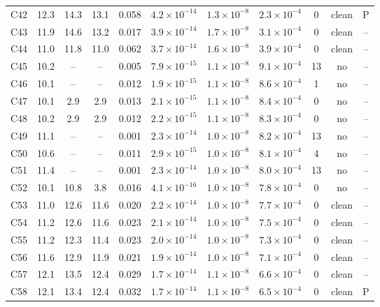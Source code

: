 \documentclass[twocolumn,epjc3]{svjour3}
\begin{document}
\begin{table}[t]
\begin{tabular}{lcccccccccc}
C42 & 12.3 & 14.3 & 13.1 & 0.058 & $4.2\!\times\!10^{-14}$ & $1.3\!\times\!10^{-8}$ & $2.3\!\times\!10^{-4}$ & 0 & clean & P\\
C43 & 11.9 & 14.6 & 13.2 & 0.017 & $3.9\!\times\!10^{-14}$ & $1.7\!\times\!10^{-8}$ & $3.1\!\times\!10^{-4}$ & 0 & clean & --\\
C44 & 11.0 & 11.8 & 11.0 & 0.062 & $3.7\!\times\!10^{-14}$ & $1.6\!\times\!10^{-8}$ & $3.9\!\times\!10^{-4}$ & 0 & clean & --\\
C45 & 10.2 & -- & -- & 0.005 & $7.9\!\times\!10^{-15}$ & $1.1\!\times\!10^{-8}$ & $9.1\!\times\!10^{-4}$ & 13 & no & --\\
C46 & 10.1 & -- & -- & 0.012 & $1.9\!\times\!10^{-15}$ & $1.1\!\times\!10^{-8}$ & $8.6\!\times\!10^{-4}$ & 1 & no & --\\
C47 & 10.1 & 2.9 & 2.9 & 0.013 & $2.1\!\times\!10^{-15}$ & $1.1\!\times\!10^{-8}$ & $8.4\!\times\!10^{-4}$ & 0 & no & --\\
C48 & 10.2 & 2.9 & 2.9 & 0.012 & $2.2\!\times\!10^{-15}$ & $1.1\!\times\!10^{-8}$ & $8.3\!\times\!10^{-4}$ & 0 & no & --\\
C49 & 11.1 & -- & -- & 0.001 & $2.3\!\times\!10^{-14}$ & $1.0\!\times\!10^{-8}$ & $8.2\!\times\!10^{-4}$ & 13 & no & --\\
C50 & 10.6 & -- & -- & 0.011 & $2.9\!\times\!10^{-15}$ & $1.0\!\times\!10^{-8}$ & $8.1\!\times\!10^{-4}$ & 4 & no & --\\
C51 & 11.4 & -- & -- & 0.001 & $2.3\!\times\!10^{-14}$ & $1.0\!\times\!10^{-8}$ & $8.0\!\times\!10^{-4}$ & 13 & no & --\\
C52 & 10.1 & 10.8 & 3.8 & 0.016 & $4.1\!\times\!10^{-16}$ & $1.0\!\times\!10^{-8}$ & $7.8\!\times\!10^{-4}$ & 0 & no & --\\
C53 & 11.0 & 12.6 & 11.6 & 0.020 & $2.2\!\times\!10^{-14}$ & $1.0\!\times\!10^{-8}$ & $7.7\!\times\!10^{-4}$ & 0 & clean & --\\
C54 & 11.2 & 12.6 & 11.6 & 0.023 & $2.1\!\times\!10^{-14}$ & $1.0\!\times\!10^{-8}$ & $7.5\!\times\!10^{-4}$ & 0 & clean & --\\
C55 & 11.2 & 12.3 & 11.4 & 0.023 & $2.0\!\times\!10^{-14}$ & $1.0\!\times\!10^{-8}$ & $7.3\!\times\!10^{-4}$ & 0 & clean & --\\
C56 & 11.6 & 12.9 & 11.9 & 0.021 & $1.9\!\times\!10^{-14}$ & $1.0\!\times\!10^{-8}$ & $7.1\!\times\!10^{-4}$ & 0 & clean & --\\
C57 & 12.1 & 13.5 & 12.4 & 0.029 & $1.7\!\times\!10^{-14}$ & $1.1\!\times\!10^{-8}$ & $6.6\!\times\!10^{-4}$ & 0 & clean & --\\
C58 & 12.1 & 13.4 & 12.4 & 0.032 & $1.7\!\times\!10^{-14}$ & $1.1\!\times\!10^{-8}$ & $6.5\!\times\!10^{-4}$ & 0 & clean & P\\
\bottomrule\end{tabular}\end{table}
\end{document}
